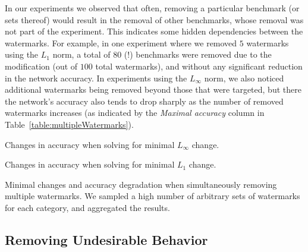 \documentclass{easychair}
\begin{document}
In our experiments we observed that often, removing a particular
benchmark (or sets thereof) would result in the removal of other
benchmarks, whose removal was not part of the experiment. This
indicates some hidden dependencies between the watermarks.  For
example, in one experiment where we removed $5$ watermarks using the
$L_1$ norm, a total of $80$ (!) benchmarks were removed
due to the modification (out of $100$ total watermarks),
and without any significant reduction in the network accuracy. In
experiments using the
$L_\infty$ norm, we also noticed additional watermarks being removed
beyond those that were targeted, but there the network's accuracy also
tends to drop sharply as the number of removed watermarks increases (as indicated by the
\emph{Maximal accuracy} column in Table~\ref{table:multipleWatermarks}).


\begin{table}
\begin{subtable}{1\textwidth}
\centering
{}
\caption{Changes in accuracy when solving for minimal $L_\infty$ change.}
\end{subtable}
\begin{subtable}{1\textwidth}
\centering
{}
\caption{Changes in accuracy when solving for minimal $L_1$ change.}
\end{subtable}
\caption{Minimal changes and accuracy degradation when simultaneously
  removing multiple watermarks. We sampled a high number of arbitrary
  sets of watermarks for each category, and aggregated the results.}
\label{table:multipleWatermarks}
\end{table}


\subsection{Removing Undesirable Behavior}
\end{document}
